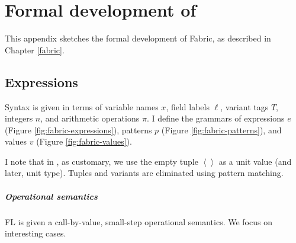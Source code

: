 \chapter{Formal development of \fabric{}}
\label{extra:fabric}

This appendix sketches the formal development of Fabric, as described in Chapter \ref{fabric}.

\section{Expressions}

Syntax is given in terms of variable names $x$, field labels $\ell$, variant tags $T$, integers $n$, and arithmetic operations $\pi$. I define the grammars of expressions $e$ (Figure \ref{fig:fabric-expressions}), patterns $p$ (Figure \ref{fig:fabric-patterns}), and values $v$ (Figure \ref{fig:fabric-values}).

\newcommand{\fbtuple}[1]{\left\langle#1\right\rangle}
\newcommand{\fbmatch}[1]{\mathrm{match}\,#1\,\mathrm{with}\,}

I note that in \fabric{}, as customary, we use the empty tuple $\fbtuple{}$ as a unit value (and later, unit type). Tuples and variants are eliminated using pattern matching.

\paragraph{Operational semantics}
FL is given a call-by-value, small-step operational semantics.
We focus on interesting cases. 

